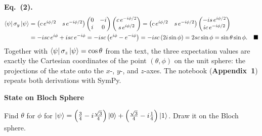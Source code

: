 \documentclass[a4paper, 10pt]{article}
\begin{document}
\begin{solution}
	\noindent \textbf{Eq.~(2).}
	\begin{align*}
		\bra{\psi}\sigma_y\ket{\psi}
		 & = \begin{pmatrix} c\,e^{i\phi/2} & s\,e^{-i\phi/2} \end{pmatrix}\begin{pmatrix} 0 & -i \\ i & 0 \end{pmatrix}\begin{pmatrix} c\,e^{-i\phi/2} \\ s\,e^{i\phi/2} \end{pmatrix}
		= \begin{pmatrix} c\,e^{i\phi/2} & s\,e^{-i\phi/2} \end{pmatrix}\begin{pmatrix} -is\,e^{i\phi/2} \\ ic\,e^{-i\phi/2} \end{pmatrix} \\
		 & = -isc\,e^{i\phi} + isc\,e^{-i\phi} = -isc\left(e^{i\phi} - e^{-i\phi}\right) = -isc\left(2i\sin\phi\right) = 2sc\sin\phi = \sin\theta\sin\phi. \quad \blacksquare
	\end{align*}
	Together with \( \bra{\psi}\sigma_z\ket{\psi} = \cos\theta \) from the text, the three expectation values are exactly the Cartesian coordinates of the point \( (\theta, \phi) \) on the unit sphere: the projections of the state onto the \( x \)-, \( y \)-, and \( z \)-axes.
	The notebook (\textbf{Appendix~1}) repeats both derivations with SymPy.
\end{solution}

\begin{problem}
\textbf{State on Bloch Sphere}
\par Find \( \theta \) for \( \phi \) for \( \ket{\psi} = \left(\frac{3}{4} - i\frac{\sqrt{3}}{4}\right) \ket{0} + \left(\frac{\sqrt{3}}{4} - i\frac{1}{4}\right) \ket{1} \).
Draw it on the Bloch sphere.
\end{problem}
\end{document}
